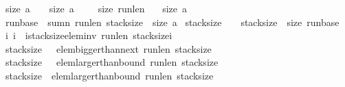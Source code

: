 \begin{isabellebody}
{\isacharparenleft}size\ a\ {\isasymge}\ {}{}{}{}{}{}\ {\isasymand}\ size\ a\ {\isacharless}\ {}{}{}{}{}{}{}{}{}{}\ {\isasymlongrightarrow}\ \ size\ run{\isacharunderscore}len\ {\isacharequal}\ {}{}{\isacharparenright}\ {\isasymand}\isanewline
{\isacharparenleft}size\ a\ {\isacharless}\ {}{}{}{}{}{}{}{}{}{}{\isacharparenright}\ {\isasymand}\isanewline
{\isacharparenleft}run{\isacharunderscore}base{\isacharbang}{}\ {\isacharplus}\ {\isacharparenleft}sumn\ run{\isacharunderscore}len\ stack{\isacharunderscore}size{\isacharparenright}\ {\isasymle}\ size\ a{\isacharparenright}\ {\isasymand}\isanewline
{\isacharparenleft}stack{\isacharunderscore}size\ {\isasymge}\ {}{\isacharparenright}\ {\isasymand}\ {\isacharparenleft}stack{\isacharunderscore}size\ {\isasymle}\ size\ run{\isacharunderscore}base{\isacharparenright}\ {\isasymand}\isanewline
{\isacharparenleft}{\isasymforall}i{\isachardot}\ {\isacharparenleft}{\isacharparenleft}i{\isasymge}{}\ {\isasymand}\ i{\isasymle}stack{\isacharunderscore}size{\isacharparenright}{\isasymlongrightarrow}{\isacharparenleft}elem{\isacharunderscore}inv\ run{\isacharunderscore}len\ {\isacharparenleft}stack{\isacharunderscore}size{\isacharminus}i{\isacharparenright}\ {}{}{\isacharparenright}{\isacharparenright}{\isacharparenright}\ {\isasymand}\isanewline
{\isacharparenleft}stack{\isacharunderscore}size\ {\isasymge}{}\ {\isasymlongrightarrow}\ elem{\isacharunderscore}bigger{\isacharunderscore}than{\isacharunderscore}next\ run{\isacharunderscore}len\ {\isacharparenleft}stack{\isacharunderscore}size{\isacharminus}{}{\isacharparenright}{\isacharparenright}\ {\isasymand}\isanewline
{\isacharparenleft}stack{\isacharunderscore}size\ {\isasymge}{}\ {\isasymlongrightarrow}\ elem{\isacharunderscore}larger{\isacharunderscore}than{\isacharunderscore}bound\ run{\isacharunderscore}len\ {\isacharparenleft}stack{\isacharunderscore}size{\isacharminus}{}{\isacharparenright}\ {}{}{\isacharparenright}\ {\isasymand}\isanewline
{\isacharparenleft}stack{\isacharunderscore}size\ {\isasymge}{}\ {\isasymlongrightarrow}elem{\isacharunderscore}larger{\isacharunderscore}than{\isacharunderscore}bound\ run{\isacharunderscore}len\ {\isacharparenleft}stack{\isacharunderscore}size{\isacharminus}{}{\isacharparenright}\ {}{}{\isacharparenright}\ {\isasymand}\isanewline

\end{isabellebody}
